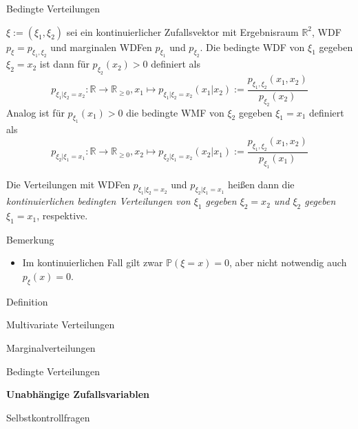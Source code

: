 \documentclass[
  8pt,
  ignorenonframetext,
]{beamer}
\providecommand{\tightlist}{%
  \setlength{\itemsep}{0pt}\setlength{\parskip}{0pt}}
\begin{document}
\begin{frame}{Bedingte Verteilungen}
\protect\hypertarget{bedingte-verteilungen-3}{}
\footnotesize
\begin{definition}
\justifying
$\xi:= (\xi_1,\xi_2)$ sei ein kontinuierlicher Zufallsvektor mit Ergebnisraum 
$\mathbb{R}^2$, WDF $p_\xi = p_{\xi_1,\xi_2}$ und marginalen WDFen $p_{\xi_1}$ und $p_{\xi_2}$.
Die bedingte WDF von $\xi_1$ gegeben $\xi_2 = x_2$ ist dann für $p_{\xi_2}(x_2) > 0$ definiert als
\begin{equation}
p_{\xi_1|\xi_2 = x_2} : \mathbb{R} \to \mathbb{R}_{\ge 0},
x_1 \mapsto p_{\xi_1|\xi_2 = x_2}(x_1|x_2) := \frac{p_{\xi_1,\xi_2}(x_1,x_2)}{p_{\xi_2}(x_2)}
\end{equation}
Analog ist für $p_{\xi_1}(x_1) > 0$ die bedingte WMF von $\xi_2$ gegeben $\xi_1 = x_1$ definiert als
\begin{equation}
p_{\xi_2|\xi_1 = x_1} : \mathbb{R} \to \mathbb{R}_{\ge 0},
x_2 \mapsto p_{\xi_2|\xi_1 = x_2}(x_2|x_1) := \frac{p_{\xi_1,\xi_2}(x_1,x_2)}{p_{\xi_1}(x_1)}
\end{equation}

Die Verteilungen mit WDFen $p_{\xi_1|\xi_2 = x_2}$ und $p_{\xi_2|\xi_1 = x_1}$ heißen dann
die \textit{kontinuierlichen bedingten Verteilungen von $\xi_1$ gegeben $\xi_2 = x_2$ 
und $\xi_2$ gegeben $\xi_1 = x_1$}, respektive.
\end{definition}

Bemerkung

\begin{itemize}
\tightlist
\item
  Im kontinuierlichen Fall gilt zwar \(\mathbb{P}(\xi = x) = 0\), aber
  nicht notwendig auch \(p_\xi(x) = 0\).
\end{itemize}
\end{frame}

\begin{frame}{}
\protect\hypertarget{section-9}{}
\large
{}
\vfill

Definition

Multivariate Verteilungen

Marginalverteilungen

Bedingte Verteilungen

\textbf{Unabhängige Zufallsvariablen}

Selbstkontrollfragen

\vfill
\end{frame}
\end{document}
